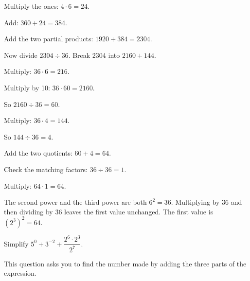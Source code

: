 \begin{steps}
  \item Multiply the ones: $4 \cdot 6 = 24$.
  \item Add: $360 + 24 = 384$.
  \item Add the two partial products: $1920 + 384 = 2304$.
  \item Now divide $2304 \div 36$. Break 2304 into $2160 + 144$.
  \item Multiply: $36 \cdot 6 = 216$.
  \item Multiply by 10: $36 \cdot 60 = 2160$.
  \item So $2160 \div 36 = 60$.
  \item Multiply: $36 \cdot 4 = 144$.
  \item So $144 \div 36 = 4$.
  \item Add the two quotients: $60 + 4 = 64$.
  \item Check the matching factors: $36 \div 36 = 1$.
  \item Multiply: $64 \cdot 1 = 64$.
\end{steps}


The second power and the third power are both $6^{2} = 36$. Multiplying by 36
and then dividing by 36 leaves the first value unchanged. The first value is
$(2^{3})^{2} = 64$.


Simplify $5^{0} + 3^{-2} + \dfrac{2^{6} \cdot 2^{3}}{2^{7}}$.


This question asks you to find the number made by adding the three parts of the
expression.

